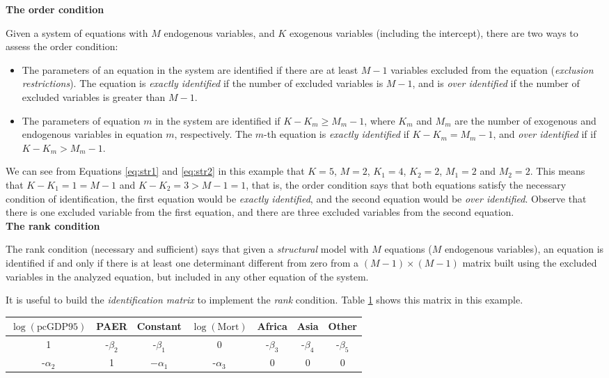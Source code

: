 \textbf{The order condition}

Given a system of equations with $M$ endogenous variables, and $K$ exogenous variables (including the intercept), there are two ways to assess the order condition:
\begin{itemize}
	\item The parameters of an equation in the system are identified if there are at least $M-1$ variables excluded from the equation (\textit{exclusion restrictions}). The equation is \textit{exactly identified} if the number of excluded variables is $M-1$, and is \textit{over identified} if the number of excluded variables is greater than $M-1$.
	\item The parameters of equation $m$ in the system are identified if $K-K_m\geq M_m-1$, where $K_m$ and $M_m$ are the number of exogenous and endogenous variables in equation $m$, respectively. The $m$-th equation is \textit{exactly identified} if $K-K_m = M_m-1$, and \textit{over identified} if if $K-K_m > M_m-1$. 
\end{itemize}

We can see from Equations \ref{eq:str1} and \ref{eq:str2} in this example that $K=5$, $M=2$, $K_1=4$, $K_2=2$, $M_1=2$ and $M_2=2$. This means that $K-K_1=1=M-1$ and $K-K_2=3>M-1=1$, that is, the order condition says that both equations satisfy the necessary condition of identification, the first equation would be \textit{exactly identified}, and the second equation would be \textit{over identified}. Observe that there is one excluded variable from the first equation, and there are three excluded variables from the second equation.
\\

\textbf{The rank condition}

The rank condition (necessary and sufficient) says that given a \textit{structural} model with $M$ equations ($M$ endogenous variables), an equation is identified if and only if there is at least one determinant different from zero from a $(M-1)\times(M-1)$ matrix built using the excluded variables in the analyzed equation, but included in any other equation of the system.

It is useful to build the \textit{identification matrix} to implement the \textit{rank} condition. Table \ref{tab:71} shows this matrix in this example.

\begin{table}[!h]
	\label{tab:71}%
	\begin{tabular}{ccccccc}
		$\log(\text{pcGDP95})$ & PAER & Constant & $\log(\text{Mort})$ & Africa & Asia & Other \\
		\hline
		1 & -$\beta_2$ & -$\beta_1$ & 0 & -$\beta_3$ & -$\beta_4$ & -$\beta_5$\\
		-$\alpha_2$ & 1 & $-\alpha_1$ & -$\alpha_3$ & 0 & 0 & 0 \\
	\end{tabular}
\end{table}


